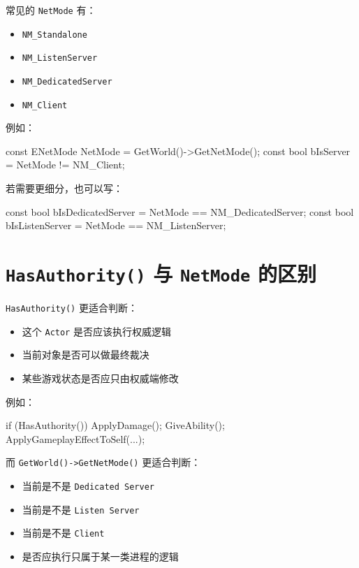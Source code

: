 常见的 \texttt{NetMode} 有：

\begin{itemize}
	\item \texttt{NM\_Standalone}
	\item \texttt{NM\_ListenServer}
	\item \texttt{NM\_DedicatedServer}
	\item \texttt{NM\_Client}
\end{itemize}

例如：

\begin{code}
	const ENetMode NetMode = GetWorld()->GetNetMode();
	const bool bIsServer = NetMode != NM_Client;
\end{code}

若需要更细分，也可以写：

\begin{code}
	const bool bIsDedicatedServer = NetMode == NM_DedicatedServer;
	const bool bIsListenServer = NetMode == NM_ListenServer;
\end{code}

\section{\texttt{HasAuthority()} 与 \texttt{NetMode} 的区别}

\texttt{HasAuthority()} 更适合判断：

\begin{itemize}
	\item 这个 \texttt{Actor} 是否应该执行权威逻辑
	\item 当前对象是否可以做最终裁决
	\item 某些游戏状态是否应只由权威端修改
\end{itemize}

例如：

\begin{code}
	if (HasAuthority())
	{
		ApplyDamage();
		GiveAbility();
		ApplyGameplayEffectToSelf(...);
	}
\end{code}

而 \texttt{GetWorld()->GetNetMode()} 更适合判断：

\begin{itemize}
	\item 当前是不是 \texttt{Dedicated Server}
	\item 当前是不是 \texttt{Listen Server}
	\item 当前是不是 \texttt{Client}
	\item 是否应执行只属于某一类进程的逻辑
\end{itemize}

